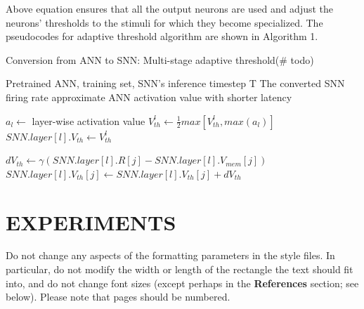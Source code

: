 \documentclass{article}
\begin{document}
Above equation ensures that all the output neurons are used and adjust the neurons’ thresholds to the
stimuli for which they become specialized.
The pseudocodes for adaptive threshold algorithm are shown in Algorithm 1.
\begin{algorithm}[h] 
	\caption{Conversion from ANN to SNN: Multi-stage adaptive threshold(\# todo)} 
	\begin{algorithmic}[1] 
		\Require 
    Pretrained ANN, training set,  SNN's inference timestep T
		\Ensure 
		The converted SNN firing rate approximate ANN activation value with shorter latency

      \State $a_l \gets$ layer-wise activation value
        \State $V_{th}^l \gets \frac{1}{2}max[V_{th}^l, max(a_l)]$
        \State $SNN.layer[l].V_{th} \gets V_{th}^l$
      \EndFor
    \EndFor

          \State $dV_{th} \gets \gamma(SNN.layer[l].R[j] - SNN.layer[l].V_{mem}[j])$
          \State $SNN.layer[l].V_{th}[j] \gets SNN.layer[l].V_{th}[j] + dV_{th}$
        \EndFor
      \EndFor
    \EndFor

	\end{algorithmic} 
\end{algorithm}




\section{EXPERIMENTS}


Do not change any aspects of the formatting parameters in the style files.  In
particular, do not modify the width or length of the rectangle the text should
fit into, and do not change font sizes (except perhaps in the
\textbf{References} section; see below). Please note that pages should be
numbered.
\end{document}
